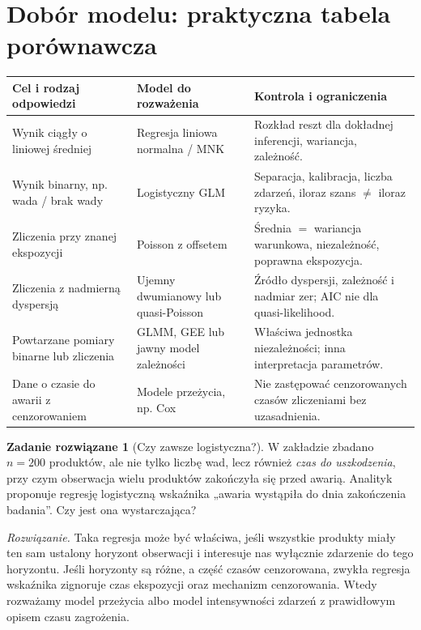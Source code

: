 \documentclass[11pt,a4paper,oneside]{report}
\numberwithin{equation}{chapter}
\theoremstyle{plain}
\theoremstyle{definition}
\newtheorem{zadanie}{Zadanie rozwiązane}[chapter]
\theoremstyle{remark}
\begin{document}
\section{Dobór modelu: praktyczna tabela porównawcza}
\begin{center}\small
\begin{tabular}{>{\raggedright\arraybackslash}p{}>{\raggedright\arraybackslash}p{}>{\raggedright\arraybackslash}p{}}
\toprule
\textbf{Cel i rodzaj odpowiedzi} & \textbf{Model do rozważenia} & \textbf{Kontrola i ograniczenia}\\
\midrule
Wynik ciągły o liniowej średniej & Regresja liniowa normalna / MNK & Rozkład reszt dla dokładnej inferencji, wariancja, zależność.\\
Wynik binarny, np. wada / brak wady & Logistyczny GLM & Separacja, kalibracja, liczba zdarzeń, iloraz szans $\ne$ iloraz ryzyka.\\
Zliczenia przy znanej ekspozycji & Poisson z offsetem & Średnia $=$ wariancja warunkowa, niezależność, poprawna ekspozycja.\\
Zliczenia z nadmierną dyspersją & Ujemny dwumianowy lub quasi-Poisson & Źródło dyspersji, zależność i nadmiar zer; AIC nie dla quasi-likelihood.\\
Powtarzane pomiary binarne lub zliczenia & GLMM, GEE lub jawny model zależności & Właściwa jednostka niezależności; inna interpretacja parametrów.\\
Dane o czasie do awarii z cenzorowaniem & Modele przeżycia, np. Cox & Nie zastępować cenzorowanych czasów zliczeniami bez uzasadnienia.\\
\bottomrule
\end{tabular}
\end{center}

\begin{zadanie}[Czy zawsze logistyczna?]
W zakładzie zbadano $n=200$ produktów, ale nie tylko
liczbę wad, lecz również \emph{czas do uszkodzenia},
przy czym obserwacja wielu produktów zakończyła się
przed awarią. Analityk proponuje regresję logistyczną
wskaźnika „awaria wystąpiła do dnia zakończenia badania”.
Czy jest ona wystarczająca?
\par\emph{Rozwiązanie.} Taka regresja może być właściwa,
jeśli wszystkie produkty miały ten sam ustalony horyzont
obserwacji i interesuje nas wyłącznie zdarzenie do
tego horyzontu. Jeśli horyzonty są różne, a część
czasów cenzorowana, zwykła regresja wskaźnika zignoruje
czas ekspozycji oraz mechanizm cenzorowania. Wtedy
rozważamy model przeżycia albo model intensywności
zdarzeń z prawidłowym opisem czasu zagrożenia.
\end{zadanie}
\end{document}
